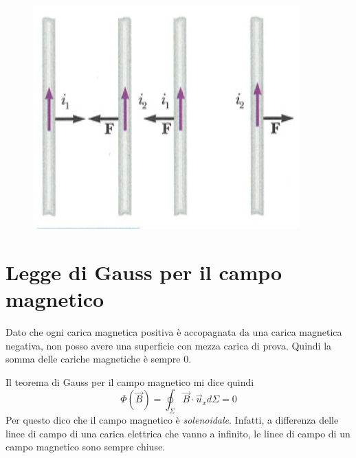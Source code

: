 \documentclass[class=book, crop=false, oneside, 12pt]{standalone}
\begin{document}
\begin{figure}[h]
    \includegraphics[scale=0.4]{int_cavi.png}
    \centering
    \caption{}
\end{figure}

\section{Legge di Gauss per il campo magnetico}

Dato che ogni carica magnetica positiva è accopagnata da una carica magnetica negativa, non posso avere una superficie con mezza carica di prova.
Quindi la somma delle cariche magnetiche è sempre \(0\).

Il teorema di Gauss per il campo magnetico mi dice quindi 
\begin{equation}
    \Phi \left(\overrightarrow{B}\right) = \oint_{\Sigma} \overrightarrow{B} \cdot \overrightarrow{u}_x d \Sigma = 0
\end{equation}
Per questo dico che il campo magnetico è \emph{solenoidale}.
Infatti, a differenza delle linee di campo di una carica elettrica che vanno a infinito, le linee di campo di un campo magnetico sono sempre chiuse.
\end{document}
